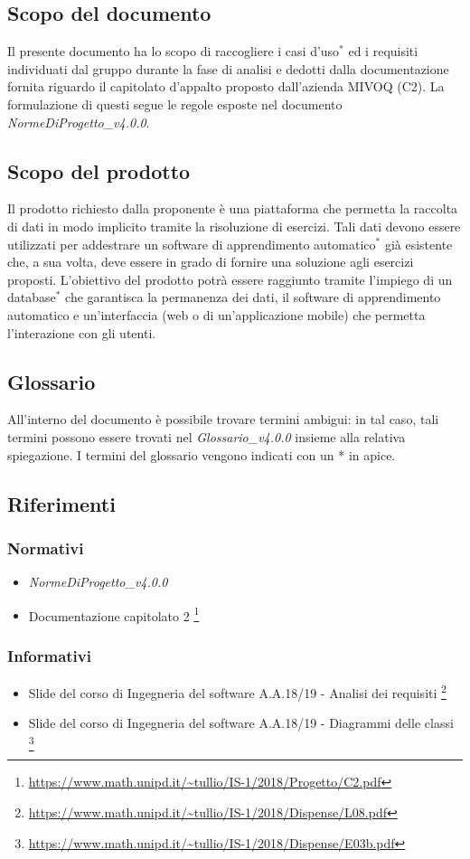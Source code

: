 \subsection{Scopo del documento}
	Il presente documento ha lo scopo di raccogliere i casi d'uso$^*$ ed i requisiti individuati dal gruppo durante la fase di analisi e dedotti dalla documentazione fornita riguardo il capitolato d'appalto proposto dall'azienda MIVOQ (C2). La formulazione di questi segue le regole esposte nel documento \textit{NormeDiProgetto\_v4.0.0}.

\subsection{Scopo del prodotto}
	Il prodotto richiesto dalla proponente è una piattaforma che permetta la raccolta di dati in modo implicito tramite la risoluzione di esercizi. Tali dati devono essere utilizzati per addestrare un software di apprendimento automatico$^*$ già esistente che, a sua volta, deve essere in grado di fornire una soluzione agli esercizi proposti. L'obiettivo del prodotto potrà essere raggiunto tramite l'impiego di un database$^*$ che garantisca la permanenza dei dati, il software di apprendimento automatico e un'interfaccia (web o di un'applicazione mobile) che permetta l'interazione con gli utenti.

\subsection{Glossario}
	All'interno del documento è possibile trovare termini ambigui: in tal caso, tali termini possono essere trovati nel \textit{Glossario\_v4.0.0} insieme alla relativa spiegazione. I termini del glossario vengono indicati con un * in apice.
	
\subsection{Riferimenti}
	\subsubsection{Normativi}
	\begin{itemize}
		\item \textit{NormeDiProgetto\_v4.0.0}
		\item Documentazione capitolato 2 \footnote{\url{https://www.math.unipd.it/~tullio/IS-1/2018/Progetto/C2.pdf}}
	
	\end{itemize}
	\subsubsection{Informativi}
	\begin{itemize}
		\item Slide del corso di Ingegneria del software A.A.18/19 - Analisi dei requisiti \footnote{\url{https://www.math.unipd.it/~tullio/IS-1/2018/Dispense/L08.pdf}}
		\item Slide del corso di Ingegneria del software A.A.18/19 - Diagrammi delle classi \footnote{\url{https://www.math.unipd.it/~tullio/IS-1/2018/Dispense/E03b.pdf}}
	\end{itemize}
		
